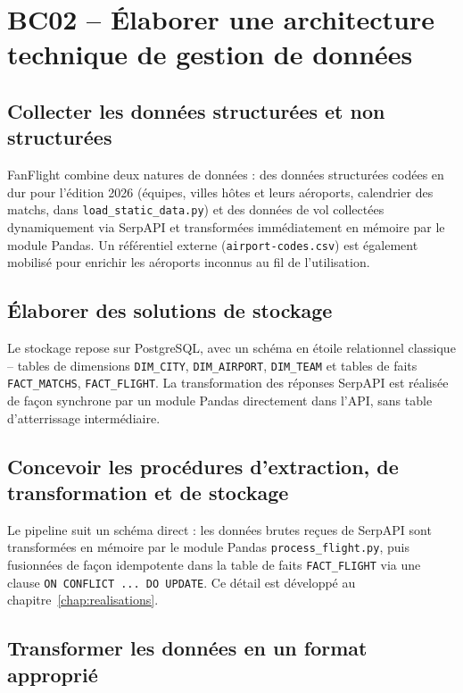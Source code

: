 \documentclass[11pt,a4paper]{report}
\newcommand{\code}[1]{\lstinline{#1}}
\begin{document}
\section{BC02 -- Élaborer une architecture technique de gestion de données}

\subsection{Collecter les données structurées et non structurées}

FanFlight combine deux natures de données : des données structurées codées en dur pour l'édition 2026 (équipes, villes hôtes et leurs aéroports, calendrier des matchs, dans \code{load_static_data.py}) et des données de vol collectées dynamiquement via SerpAPI et transformées immédiatement en mémoire par le module Pandas. Un référentiel externe (\code{airport-codes.csv}) est également mobilisé pour enrichir les aéroports inconnus au fil de l'utilisation.

\subsection{Élaborer des solutions de stockage}

Le stockage repose sur PostgreSQL, avec un schéma en étoile relationnel classique -- tables de dimensions \code{DIM_CITY}, \code{DIM_AIRPORT}, \code{DIM_TEAM} et tables de faits \code{FACT_MATCHS}, \code{FACT_FLIGHT}. La transformation des réponses SerpAPI est réalisée de façon synchrone par un module Pandas directement dans l'API, sans table d'atterrissage intermédiaire.

\subsection{Concevoir les procédures d'extraction, de transformation et de stockage}

Le pipeline suit un schéma direct : les données brutes reçues de SerpAPI sont transformées en mémoire par le module Pandas \code{process_flight.py}, puis fusionnées de façon idempotente dans la table de faits \code{FACT_FLIGHT} via une clause \code{ON CONFLICT ... DO UPDATE}. Ce détail est développé au chapitre~\ref{chap:realisations}.

\subsection{Transformer les données en un format approprié}
\end{document}
